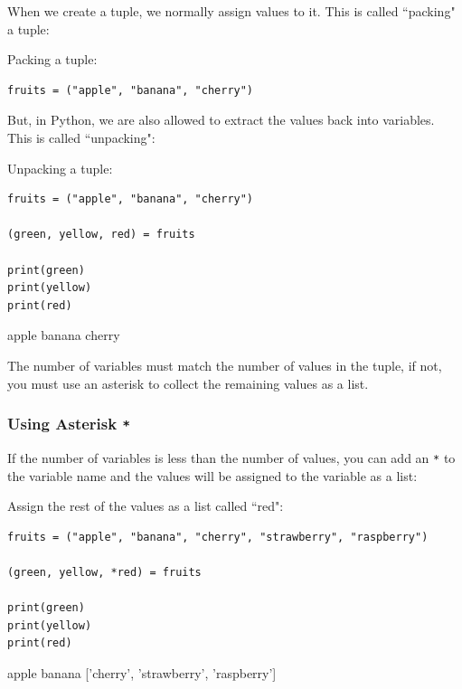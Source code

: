 \documentclass[12pt,a4paper]{article}
\newcommand{\code}[1]{%
	\colorbox{backcolour}{\lstinline{#1}}%
}
\newcommand{\lcode}[1]{%
	\lstinline{#1}%
}
\begin{document}
When we create a tuple, we normally assign values to it. This is called
``packing" a tuple:

\begin{ebox}
Packing a tuple:
	\begin{lstlisting}
fruits = ("apple", "banana", "cherry")
	\end{lstlisting}
\end{ebox}

But, in Python, we are also allowed to extract the values back into variables.
This is called ``unpacking":

\begin{ebox}
Unpacking a tuple:
	\begin{lstlisting}
fruits = ("apple", "banana", "cherry")

(green, yellow, red) = fruits

print(green)
print(yellow)
print(red)
	\end{lstlisting}
\tcblower
	\begin{vercode}
apple
banana
cherry
	\end{vercode}
\end{ebox}

\begin{nbox}
The number of variables must match the number of values in the tuple, if
not, you must use an asterisk to collect the remaining values as a list.
\end{nbox}
\subsubsection{Using Asterisk\lcode{*}}

If the number of variables is less than the number of values, you can add an
\code{*} to the variable name and the values will be assigned to the variable
as a list:

\begin{ebox}
Assign the rest of the values as a list called ``red":
	\begin{lstlisting}
fruits = ("apple", "banana", "cherry", "strawberry", "raspberry")

(green, yellow, *red) = fruits

print(green)
print(yellow)
print(red)
	\end{lstlisting}
\tcblower
	\begin{vercode}
apple
banana
['cherry', 'strawberry', 'raspberry']
	\end{vercode}
\end{ebox}
\end{document}
